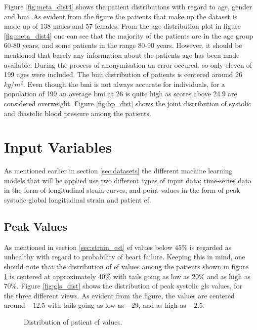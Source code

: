 Figure \ref{fig:meta_dist4} shows the patient distributions with regard to age, gender and \acrshort{bmi}. As evident from the figure the patients that make up the dataset is made up of 138 males and 57 females. From the age distribution plot in figure \ref{fig:meta_dist4} one can see that the majority of the patients are in the age group 60-80 years, and some patients in the range 80-90 years. However, it should be mentioned that barely any information about the patients age has been made available. During the process of anonymisation an error occured, so only eleven of 199 ages were included. The \acrshort{bmi} distribution of patients is centered around 26 $kg/m^2$. Even though the \acrshort{bmi} is not always accurate for individuals, for a population of 199 an average \acrshort{bmi} at 26 is quite high as scores above 24.9 are considered overweight. Figure \ref{fig:bp_dist} shows the joint distribution of systolic and diastolic blood pressure among the patients. \bigskip

\section{Input Variables} \label{sec:covariates}
As mentioned earlier in section \ref{sec:datasets} the different machine learning models that will be applied use two different types of input data; time-series data in the form of longitudinal strain curves, and point-values in the form of peak systolic global longitudinal strain and patient \acrshort{ef}. \bigskip

\subsection{Peak Values}
As mentioned in section \ref{sec:strain_est} \acrshort{ef} values below $45\%$ is regarded as unhealthy with regard to probability of heart failure. Keeping this in mind, one should note that the distribution of \acrshort{ef} values among the patients shown in figure \ref{fig:EF_dist} is centered at approximately 40$\%$ with tails going as low as 20$\%$ and as high as 70$\%$. Figure \ref{fig:gls_dist} shows the distribution of peak systolic \acrshort{gls} values, for the three different views. As evident from the figure, the values are centered around $-12.5$ with tails going as low as $-29$, and as high as $-2.5$. \bigskip

\begin{figure}[h]
    \centering
    
    \caption{Distribution of patient \acrshort{ef} values.}
    \label{fig:EF_dist}
\end{figure}

